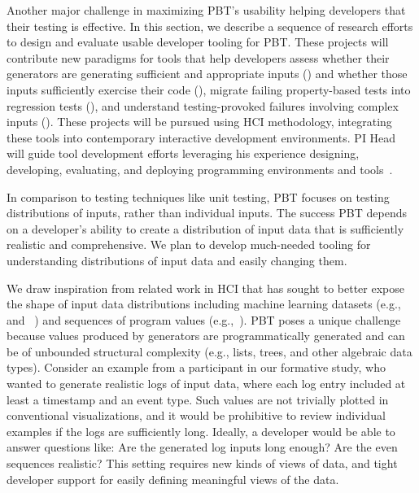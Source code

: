 
Another major challenge in maximizing PBT's usability helping developers
 that their testing is effective. In this section, we
describe a sequence of research efforts to design and evaluate usable developer
tooling for PBT. These projects will contribute new paradigms for tools that
help developers assess whether their generators are generating sufficient and
appropriate inputs () and whether those
inputs sufficiently exercise their code (), migrate
failing property-based tests into regression tests (),
and understand testing-provoked failures involving complex inputs
(). These projects will be pursued using HCI
methodology, integrating these tools into contemporary interactive development
environments. PI Head will guide tool development efforts leveraging his
experience designing, developing, evaluating, and deploying programming
environments and tools~\cite{ref:head2015tutorons,ref:suzuki2017tracediff,ref:head2017writing,ref:head2018when,ref:head2018interactive,ref:head2019managing,ref:head2020composing}.

%
In comparison to testing techniques like unit testing, PBT focuses on testing
distributions of inputs, rather than individual inputs. The success
PBT depends on a developer's ability to create a distribution
of input data that is sufficiently realistic and comprehensive. We plan
to develop much-needed tooling for
understanding distributions of input data and easily changing them.

We draw inspiration from related work in HCI that has sought to better expose
the shape of input data distributions including
machine learning datasets
(e.g.,~\cite{ref:hohman2019gamut} and
~\cite{ref:hohman2020understanding}) and sequences of program values
(e.g.,~\cite{ref:kang2017omnicode}).
PBT poses a unique challenge because values produced by generators are
programmatically generated and
can be of unbounded structural
complexity (e.g., lists, trees, and other algebraic data types).
Consider an
example from a participant in our formative study, who wanted to generate
realistic logs of input data, where each log entry included at least a timestamp
and an event type. Such values are not trivially plotted in conventional
visualizations, and it would be prohibitive to review individual examples if the
logs are sufficiently long. Ideally, a developer would be able to answer
questions like: Are the generated log inputs long enough? Are the even sequences
realistic? This setting requires new kinds of views of data, and tight
developer support for easily defining meaningful views of the data.

